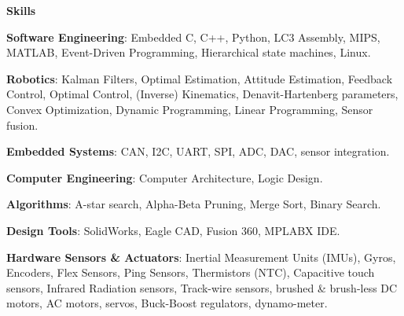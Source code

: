 \documentclass[paper=a4,fontsize=11pt]{article} %
\def \sectionSpace      {0.3cm}    %
\def \subSectionSpace   {0.25cm}     %
\def \leftColSpace      {0.1}       %
\def \bigMiddleColSpace {0.8}       %
\begin{document}
    \noindent
    \begin{minipage}[t]{\leftColSpace\linewidth}
    \noindent \textbf{Skills}\\
    \end{minipage}
    \begin{minipage}[t]{\bigMiddleColSpace\linewidth}
            \noindent \textbf{Software Engineering}: Embedded C, C++, Python, LC3 Assembly, MIPS, MATLAB, Event-Driven Programming, Hierarchical state machines, Linux.
            
            \vspace{\subSectionSpace}
            \noindent \textbf{Robotics}: Kalman Filters, Optimal Estimation, Attitude Estimation, Feedback Control, Optimal Control, (Inverse) Kinematics, Denavit-Hartenberg parameters, Convex Optimization, Dynamic Programming, Linear Programming, Sensor fusion.
            
            \vspace{\subSectionSpace}
            \noindent \textbf{Embedded Systems}: CAN, I2C, UART, SPI, ADC, DAC, sensor integration.
            
            \vspace{\subSectionSpace}
            \noindent \textbf{Computer Engineering}: Computer Architecture, Logic Design.
            
            \vspace{\subSectionSpace}
            \noindent \textbf{Algorithms}: A-star search, Alpha-Beta Pruning, Merge Sort, Binary Search.
            
            \vspace{\subSectionSpace}
            \noindent \textbf{Design Tools}: SolidWorks, Eagle CAD, Fusion 360, MPLABX IDE.
            
            \vspace{\subSectionSpace}
            \noindent \textbf{Hardware Sensors \& Actuators}: Inertial Measurement Units (IMUs), Gyros, Encoders, Flex Sensors, Ping Sensors, Thermistors (NTC), Capacitive touch sensors, Infrared Radiation sensors, Track-wire sensors, brushed \& brush-less DC motors, AC motors, servos, Buck-Boost regulators, dynamo-meter.
    \end{minipage}
\end{document}
